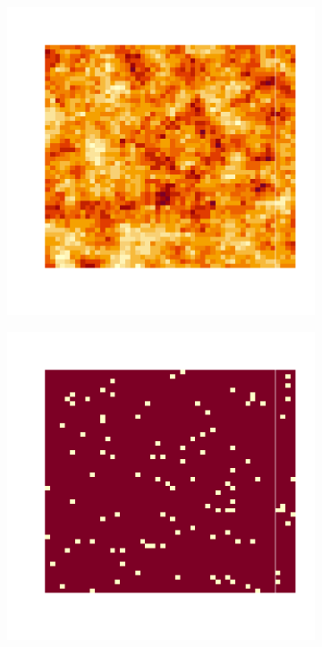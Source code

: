 \documentclass[10pt]{article} %
\begin{document}
\begin{figure}[h!]
    \centering
    \begin{subfigure}[b]{0.3\textwidth}
        \centering
        \includegraphics[width=\textwidth]{media/gauss_champ_2.png}
        \label{gauss plasma}
    \end{subfigure}
    \hfill
    \begin{subfigure}[b]{0.3\textwidth}
        \centering
        \includegraphics[width=\textwidth]{media/gauss_sites_2.png}

\end{subfigure}
\end{figure}
\end{document}
